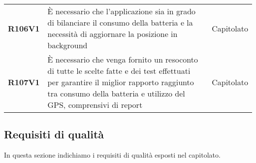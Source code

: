 \documentclass[../analisi-dei-requisiti.tex]{subfiles}
\begin{document}
\begin{longtable}[H]{>{\centering\bfseries}m{3cm} >{\centering}m{10cm} >{\centering\arraybackslash}m{3cm}}
  R106V1                               & È necessario che l'applicazione sia in grado di bilanciare il consumo della batteria e la necessità di aggiornare la posizione in background                                                                                                           & Capitolato                    \\
  R107V1                               & È necessario che venga fornito un resoconto di tutte le scelte fatte e dei test effettuati per garantire il miglior rapporto raggiunto tra consumo della batteria e utilizzo del GPS, comprensivi di report                                            & Capitolato                    \\
\end{longtable}

\newpage
\subsection{Requisiti di qualità}%
\label{sub:requisiti_di_qualita}
In questa sezione indichiamo i requisiti di qualità esposti nel capitolato.
\end{document}
